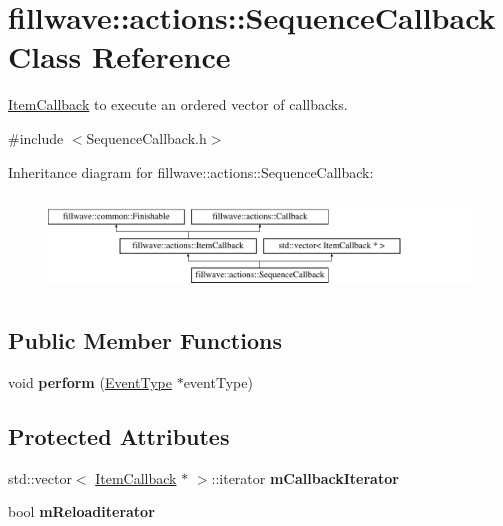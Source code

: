 \hypertarget{classfillwave_1_1actions_1_1SequenceCallback}{}\section{fillwave\+:\+:actions\+:\+:Sequence\+Callback Class Reference}
\label{classfillwave_1_1actions_1_1SequenceCallback}


\hyperlink{classfillwave_1_1actions_1_1ItemCallback}{Item\+Callback} to execute an ordered vector of callbacks.  




{\ttfamily \#include $<$Sequence\+Callback.\+h$>$}

Inheritance diagram for fillwave\+:\+:actions\+:\+:Sequence\+Callback\+:\begin{figure}[H]
\begin{center}
\leavevmode
\includegraphics[height=2.545455cm]{classfillwave_1_1actions_1_1SequenceCallback}
\end{center}
\end{figure}
\subsection*{Public Member Functions}
\begin{DoxyCompactItemize}
\item 
\hypertarget{classfillwave_1_1actions_1_1SequenceCallback_a637d6ceb20cf4c49adbafd28853234ac}{}void {\bfseries perform} (\hyperlink{classfillwave_1_1actions_1_1EventType}{Event\+Type} $\ast$event\+Type)\label{classfillwave_1_1actions_1_1SequenceCallback_a637d6ceb20cf4c49adbafd28853234ac}

\end{DoxyCompactItemize}
\subsection*{Protected Attributes}
\begin{DoxyCompactItemize}
\item 
\hypertarget{classfillwave_1_1actions_1_1SequenceCallback_a483163aa1fbb0c3889497f29e8fad93d}{}std\+::vector$<$ \hyperlink{classfillwave_1_1actions_1_1ItemCallback}{Item\+Callback} $\ast$ $>$\+::iterator {\bfseries m\+Callback\+Iterator}\label{classfillwave_1_1actions_1_1SequenceCallback_a483163aa1fbb0c3889497f29e8fad93d}

\item 
\hypertarget{classfillwave_1_1actions_1_1SequenceCallback_a7e5164a9ccafb3e3ead7630d117fe07b}{}bool {\bfseries m\+Reloaditerator}\label{classfillwave_1_1actions_1_1SequenceCallback_a7e5164a9ccafb3e3ead7630d117fe07b}

\end{DoxyCompactItemize}


